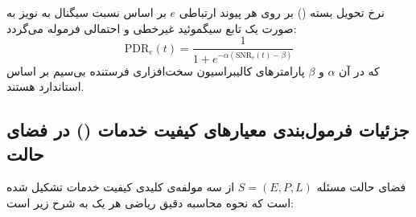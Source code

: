 \documentclass[oneside,openany,phd]{TMU-Thesis}
\begin{document}
نرخ تحویل بسته () بر روی هر پیوند ارتباطی $e$ بر اساس نسبت سیگنال به نویز به صورت یک تابع سیگموئید غیرخطی و احتمالی فرموله می‌گردد:
\begin{equation}
    \text{PDR}_e(t) = \frac{1}{1 + e^{-\alpha (\text{SNR}_e(t) - \beta)}}
\end{equation}
که در آن $\alpha$ و $\beta$ پارامترهای کالیبراسیون سخت‌افزاری فرستنده بی‌سیم بر اساس استاندارد  هستند.

\subsection{جزئیات فرمول‌بندی معیارهای کیفیت خدمات () در فضای حالت}

فضای حالت مسئله $S = (E, P, L)$ از سه مولفه‌ی کلیدی کیفیت خدمات تشکیل شده است که نحوه محاسبه دقیق ریاضی هر یک به شرح زیر است:
\end{document}
